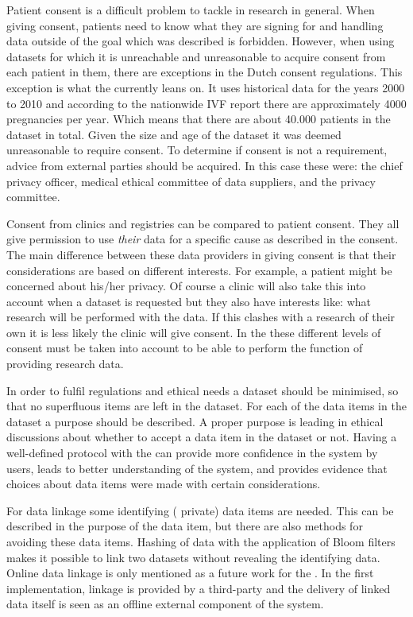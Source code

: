 Patient consent is a difficult problem to tackle in research in general.
When giving consent, patients need to know what they are signing for and handling data outside of the goal which was described is forbidden.
However, when using datasets for which it is unreachable and unreasonable to acquire consent from each patient in them, there are exceptions in the Dutch consent regulations.
This exception is what the \ivfsystem{} currently leans on. 
It uses historical data for the years 2000 to 2010 and according to the nationwide IVF report \cite{ivfReportNVOG} there are approximately 4000 pregnancies per year.
Which means that there are about 40.000 patients in the dataset in total.
Given the size and age of the dataset it was deemed unreasonable to require consent.
To determine if consent is not a requirement, advice from external parties should be acquired.
In this case these were: the \AMC{} chief privacy officer, medical ethical committee of data suppliers, and the \PRN{} privacy committee.

Consent from clinics and registries can be compared to patient consent.
They all give permission to use \emph{their} data for a specific cause as described in the consent.
The main difference between these data providers in giving consent is that their considerations are based on different interests.
For example, a patient might be concerned about his/her privacy.
Of course a clinic will also take this into account when a dataset is requested but they also have interests like: what research will be performed with the data.
If this clashes with a research of their own it is less likely the clinic will give consent.
In the \ivfsystem{} these different levels of consent must be taken into account  to be able to perform the function of providing research data.

In order to fulfil regulations and ethical needs a dataset should be minimised, so that no superfluous items are left in the dataset.
For each of the data items in the dataset a purpose should be described. 
A proper purpose is leading in ethical discussions about whether to accept a data item in the dataset or not.
Having a well-defined protocol with the \ivfsystem{} can provide more confidence in the system by users, leads to better understanding of the system, and provides evidence that choices about data items were made with certain considerations.

For data linkage some identifying (\ie{} private) data items are needed.
This can be described in the purpose of the data item, but there are also methods for avoiding these data items.
Hashing of data with the application of Bloom filters \cite{s22schnell2009} makes it possible to link two datasets without revealing the identifying data.
Online data linkage is only mentioned as a future work for the \ivfsystem{}.
In the first implementation, linkage is provided by a third-party and the delivery of linked data itself is seen as an offline external component of the system.

